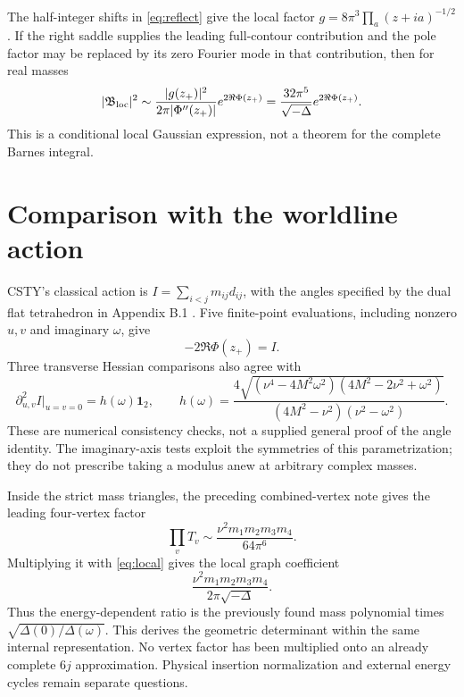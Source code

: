 \documentclass[11pt,a4paper]{article}
\begin{document}
The half-integer shifts in \eqref{eq:reflect} give the local factor
\(g=8\pi^3\prod_a(z+ia)^{-1/2}\). If the right saddle supplies the
leading full-contour contribution and the pole factor may be replaced
by its zero Fourier mode in that contribution, then for real masses
\begin{equation}
 |\mathfrak B_{\rm loc}|^2\sim
 \frac{|g(z_+)|^2}{2\pi|\Phi''(z_+)|}e^{2\Re\Phi(z_+)}
 =\frac{32\pi^5}{\sqrt{-\Delta}}e^{2\Re\Phi(z_+)}.
 \label{eq:local}
\end{equation}
This is a conditional local Gaussian expression, not a theorem
for the complete Barnes integral.

\section{Comparison with the worldline action}
CSTY's classical action is \(I=\sum_{i<j}m_{ij}d_{ij}\), with the
angles specified by the dual flat tetrahedron in Appendix B.1
\cite{CSTY}. Five finite-point evaluations, including nonzero \(u,v\)
and imaginary \(\omega\), give
\[
 -2\Re\Phi(z_+)=I.
\]
Three transverse Hessian comparisons also agree with
\[
 \partial_{u,v}^2 I\big|_{u=v=0}=h(\omega)\mathbf1_2,\qquad
 h(\omega)=
 \frac{4\sqrt{(\nu^4-4M^2\omega^2)(4M^2-2\nu^2+\omega^2)}}
 {(4M^2-\nu^2)(\nu^2-\omega^2)}.
\]
These are numerical consistency checks, not a supplied general
proof of the angle identity. The imaginary-axis tests exploit the
symmetries of this parametrization; they do not prescribe taking
a modulus anew at arbitrary complex masses.

Inside the strict mass triangles, the preceding combined-vertex
note gives the leading four-vertex factor
\[
 \prod_v T_v\sim \frac{\nu^2m_1m_2m_3m_4}{64\pi^6}.
\]
Multiplying it with \eqref{eq:local} gives the local graph coefficient
\begin{equation}
 \frac{\nu^2m_1m_2m_3m_4}{2\pi\sqrt{-\Delta}}.
 \label{eq:graphfactor}
\end{equation}
Thus the energy-dependent ratio is the previously found mass
polynomial times \(\sqrt{\Delta(0)/\Delta(\omega)}\).
This derives the geometric determinant within the same internal
representation. No vertex factor has been multiplied onto an already
complete \(6j\) approximation. Physical insertion normalization and
external energy cycles remain separate questions.
\end{document}
